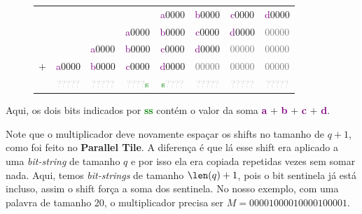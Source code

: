 \begin{figure}[h]
\bf \Large \centering
\begin{tabular}{cccccccc}
& & & & \textcolor{Purple}{a}\textcolor{CarnationPink}{0000} &
\textcolor{Purple}{b}\textcolor{CarnationPink}{0000} &
\textcolor{Purple}{c}\textcolor{CarnationPink}{0000} &
\textcolor{Purple}{d}\textcolor{CarnationPink}{0000} \\
& & & \textcolor{Purple}{a}\textcolor{CarnationPink}{0000} &
\textcolor{Purple}{b}\textcolor{CarnationPink}{0000} &
\textcolor{Purple}{c}\textcolor{CarnationPink}{0000} &
\textcolor{Purple}{d}\textcolor{CarnationPink}{0000} &
\textcolor{gray}{00000} \\
& & \textcolor{Purple}{a}\textcolor{CarnationPink}{0000} &
\textcolor{Purple}{b}\textcolor{CarnationPink}{0000} &
\textcolor{Purple}{c}\textcolor{CarnationPink}{0000} &
\textcolor{Purple}{d}\textcolor{CarnationPink}{0000} &
\textcolor{gray}{00000} &
\textcolor{gray}{00000} \\
$+$ & \textcolor{Purple}{a}\textcolor{CarnationPink}{0000} & \textcolor{Purple}{b}\textcolor{CarnationPink}{0000} &
\textcolor{Purple}{c}\textcolor{CarnationPink}{0000} & 
\textcolor{Purple}{d}\textcolor{CarnationPink}{0000} & 
\textcolor{gray}{00000} & 
\textcolor{gray}{00000} & 
\textcolor{gray}{00000} \\
\hline
& \textcolor{lightgray}{?????} &
\textcolor{lightgray}{?????} & 
\textcolor{lightgray}{????}\textcolor{Green}{s} & 
\textcolor{Green}{s}\textcolor{lightgray}{????} & 
\textcolor{lightgray}{?????} &
\textcolor{lightgray}{?????} & 
\textcolor{lightgray}{?????}
\end{tabular}
\end{figure}

Aqui, os dois bits indicados por \textbf{\textcolor{Green}{ss}} contém o valor
da soma \textbf{\textcolor{Purple}{a}} $+$ \textbf{\textcolor{Purple}{b}} $+$
\textbf{\textcolor{Purple}{c}} $+$ \textbf{\textcolor{Purple}{d}}.

Note que o multiplicador deve novamente espaçar os shifts no tamanho de $q+1$,
como foi feito no \textbf{Parallel Tile}. A diferença é que lá esse shift era
aplicado a uma \textit{bit-string} de tamanho $q$ e por isso ela era copiada
repetidas vezes sem somar nada. Aqui, temos \textit{bit-strings} de tamanho
$\len(q)+1$, pois o bit sentinela já está incluso, assim o shift força a soma
dos sentinela. No nosso exemplo, com uma palavra de tamanho 20, o multiplicador
precisa ser $M=00001000010000100001$.

